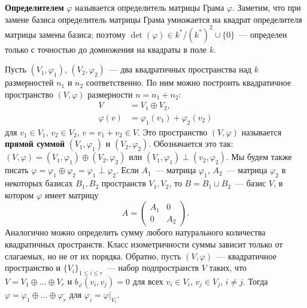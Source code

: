 \documentclass[a4paper,oneside,12pt]{article}
\theoremstyle{plain} { \swapnumbers
\newtheorem{theorem}{Теорема}[subsection]
\newtheorem{corollary}[theorem]{Следствие}
\newtheorem{lemma}[theorem]{Лемма}
\newtheorem{proposition}[theorem]{Утверждение}
\newtheorem{claim}[theorem]{Факт}
}
\theoremstyle{definition} { \swapnumbers
\newtheorem{definition}[theorem]{Определение}
\newtheorem{notation}[theorem]{Обозначение}
\newtheorem{remark}[theorem]{Замечание}
\newtheorem{remarks}[theorem]{Замечания}
\newtheorem{example}[theorem]{Пример}
\newtheorem{examples}[theorem]{Примеры}
\newtheorem{sssection}[theorem]{}
}
\def\ph{\varphi}
\begin{document}
{\bf Определителем} $\ph$ называется определитель матрицы Грама $\ph$. Заметим,
что при замене базиса определитель матрицы Грама умножается на квадрат определителя
матрицы замены базиса; поэтому $\det(\ph)\in k^*/(k^*)^2\cup\{0\}$~--- определен
только с точностью до домножения на квадраты в поле $k$.

Пусть $(V_1,\ph_1)$, $(V_2,\ph_2)$~--- два квадратичных пространства над $k$ размерностей
$n_1$ и $n_2$ соответственно. По ним можно построить квадратичное пространство
$(V,\ph)$ размерности $n=n_1+n_2$:
$$
\begin{aligned}
V&=V_1\oplus V_2,\\
\ph(v)&=\ph_1(v_1)+\ph_2(v_2)
\end{aligned}
$$
для $v_1\in V_1$, $v_2\in V_2$, $v=v_1+v_2\in V$. Это пространство $(V,\ph)$ называется
{\bf прямой суммой} $(V_1,\ph_1)$ и $(V_2,\ph_2)$. Обозначается это так:
$(V,\ph)=(V_1,\ph_1)\oplus(V_2,\ph_2)$ или $(V_1,\ph_1)\perp(v_2,\ph_2)$.
Мы будем также писать
$\ph=\ph_1\oplus\ph_2=\ph_1\perp\ph_2$. Если $A_1$~--- матрица $\ph_1$, $A_2$~--- матрица
$\ph_2$ в некоторых базисах $B_1,B_2$ пространств $V_1,V_2$, то $B=B_1\sqcup B_2$~---
базис $V$, в котором $\ph$ имеет матрицу
$$
A=\begin{pmatrix} A_1 & 0 \\ 0 & A_2\end{pmatrix}.
$$
Аналогично можно определить сумму любого натурального количества квадратичных пространств.
Класс изометричности суммы зависит только от слагаемых, но не от их порядка.
Обратно, пусть $(V,\ph)$~--- квадратичное пространство и $\{V_i\}_{1\leq i\leq r}$~---
набор подпространств $V$ таких, что $V=V_1\oplus\dots\oplus V_r$ и $b_\ph(v_i,v_j)=0$
для всех $v_i\in V_i$, $v_j\in V_j$, $i\neq j$. Тогда $\ph=\ph_1\oplus\dots\oplus\ph_r$
для $\ph_i=\ph|_{V_i}$.
\end{document}
